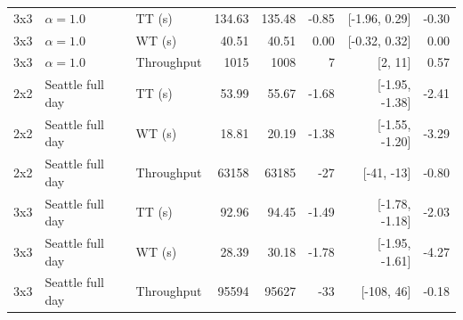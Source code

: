 \begin{table}[H]
{\begin{tabular}{lllrrrrr}
3x3 & $\alpha=1.0$ & TT (s) & 134.63 & 135.48 & -0.85 & [-1.96, 0.29] & -0.30 \\
3x3 & $\alpha=1.0$ & WT (s) & 40.51 & 40.51 & 0.00 & [-0.32, 0.32] & 0.00 \\
3x3 & $\alpha=1.0$ & Throughput & 1015 & 1008 & 7 & [2, 11] & 0.57 \\
\addlinespace
2x2 & Seattle full day & TT (s) & 53.99 & 55.67 & -1.68 & [-1.95, -1.38] & -2.41 \\
2x2 & Seattle full day & WT (s) & 18.81 & 20.19 & -1.38 & [-1.55, -1.20] & -3.29 \\
2x2 & Seattle full day & Throughput & 63158 & 63185 & -27 & [-41, -13] & -0.80 \\
\addlinespace
3x3 & Seattle full day & TT (s) & 92.96 & 94.45 & -1.49 & [-1.78, -1.18] & -2.03 \\
3x3 & Seattle full day & WT (s) & 28.39 & 30.18 & -1.78 & [-1.95, -1.61] & -4.27 \\
3x3 & Seattle full day & Throughput & 95594 & 95627 & -33 & [-108, 46] & -0.18 \\
\bottomrule
\end{tabular}
}
\end{table}
